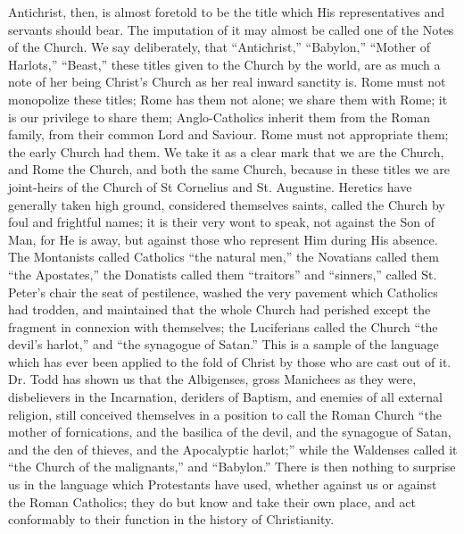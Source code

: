 Antichrist, then, is almost foretold to be the title which His
representatives and servants should bear. The imputation of it may
almost be called one of the Notes of the Church. We say deliberately,
that ``Antichrist,'' ``Babylon,'' ``Mother of
Harlots,'' ``Beast,'' these titles given to the Church by
the world, are as much a note of her being Christ's Church as her real
inward sanctity is. Rome must not monopolize these titles; Rome has
them not alone; we share them with Rome; it is our privilege to share
them; Anglo-Catholics inherit them from the Roman family, from their
common Lord and Saviour. Rome must not appropriate them; the early
Church had them. We take it as a clear mark that we are the
Church, and Rome the Church, and both the same Church, because in
these titles we are joint-heirs of the Church of St Cornelius and St.
Augustine. Heretics have generally taken high ground, considered
themselves saints, called the Church by foul and frightful names; it
is their very wont to speak, not against the Son of Man, for He is
away, but against those who represent Him during His absence. The
Montanists called Catholics ``the natural men,'' the Novatians
called them ``the Apostates,'' the Donatists called them
``traitors'' and ``sinners,'' called St. Peter's chair
the seat of pestilence, washed the very pavement which Catholics had
trodden, and maintained that the whole Church had perished except the
fragment in connexion with themselves; the Luciferians called the
Church ``the devil's harlot,'' and ``the synagogue of
Satan.'' This is a sample of the language which has ever been
applied to the fold of Christ by those who are cast out of it. Dr.
Todd has shown us that the Albigenses, gross Manichees as they were,
disbelievers in the Incarnation, deriders of Baptism, and enemies of
all external religion, still conceived themselves in a position to
call the Roman Church ``the mother of fornications, and the
basilica of the devil, and the synagogue of Satan, and the den of
thieves, and the Apocalyptic harlot;'' while the Waldenses called
it ``the Church of the malignants,'' and ``Babylon.''
There is then nothing to surprise us in the language which Protestants
have used, whether against us or against the Roman Catholics; they do
but know and take their own place, and act conformably to their
function in the history of Christianity.

